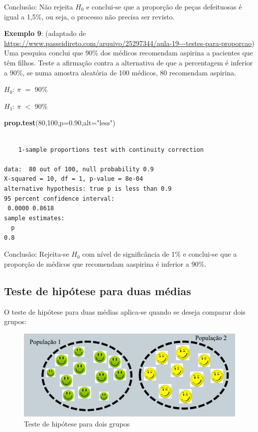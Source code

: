 \documentclass[12pt,brazil,oneside]{book}
\newenvironment{Shaded}{\begin{snugshade}}{\end{snugshade}}
\newcommand{\DataTypeTok}[1]{\textcolor[rgb]{0.13,0.29,0.53}{#1}}
\newcommand{\DecValTok}[1]{\textcolor[rgb]{0.00,0.00,0.81}{#1}}
\newcommand{\FloatTok}[1]{\textcolor[rgb]{0.00,0.00,0.81}{#1}}
\newcommand{\KeywordTok}[1]{\textcolor[rgb]{0.13,0.29,0.53}{\textbf{#1}}}
\newcommand{\NormalTok}[1]{#1}
\newcommand{\StringTok}[1]{\textcolor[rgb]{0.31,0.60,0.02}{#1}}
\begin{document}
Conclusão: Não rejeita \(H_0\) e conclui-se que a proporção de peças defeituosas é igual a 1,5\%, ou seja, o processo não precisa ser revisto.

\textbf{Exemplo 9}: (adaptado de \url{https://www.passeidireto.com/arquivo/25297344/aula-19---testes-para-proporcao}) Uma pesquisa conclui que 90\% dos médicos recomendam aspirina a pacientes que têm filhos. Teste a afirmação contra a alternativa de que a percentagem é inferior a 90\%, se numa amostra aleatória de 100 médicos, 80 recomendam aspirina.

\textbf{\(H_0\)}: \(\pi\) \(=\) 90\%

\textbf{\(H_1\)}: \(\pi\) \(<\) 90\%

\begin{Shaded}
\begin{Highlighting}[]
\KeywordTok{prop.test}\NormalTok{(}\DecValTok{80}\NormalTok{,}\DecValTok{100}\NormalTok{,}\DataTypeTok{p=}\FloatTok{0.90}\NormalTok{,}\DataTypeTok{alt=}\StringTok{"less"}\NormalTok{)}
\end{Highlighting}
\end{Shaded}

\begin{verbatim}

    1-sample proportions test with continuity correction

data:  80 out of 100, null probability 0.9
X-squared = 10, df = 1, p-value = 8e-04
alternative hypothesis: true p is less than 0.9
95 percent confidence interval:
 0.0000 0.8618
sample estimates:
  p 
0.8 
\end{verbatim}

Conclusão: Rejeita-se \(H_0\) com nível de significância de 1\% e conclui-se que a proporção de médicos que recomendam aaspirina é inferior a 90\%.

\hypertarget{teste-de-hipotese-para-duas-medias}{%
\subsection{Teste de hipótese para duas médias}\label{teste-de-hipotese-para-duas-medias}}

O teste de hipótese para duas médias aplica-se quando se deseja comparar dois grupos:

\begin{figure}[H]

{\centering \includegraphics[width=0.7\linewidth]{testehip2} 

}

\caption{Teste de hipótese para dois grupos}\label{fig:testehip2}
\end{figure}
\end{document}

